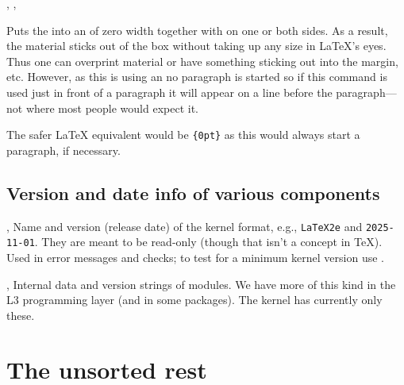 \documentclass{l3in2edoc}
\begin{document}
\begin{function}[]
  {
    \clap,
    \llap,
    \rlap
  }
  \begin{syntax}
     
  \end{syntax}
  Puts the  into an  of zero width together
  with  on one or both sides. As a result, the material sticks
  out of the box without taking up any size in \LaTeX{}'s eyes. Thus
  one can overprint material or have something sticking out into the
  margin, etc. However, as this is using an  no paragraph is
  started so if this command is used just in front of a paragraph it
  will appear on a line before the paragraph---not where most people
  would expect it.

  The safer \LaTeX{} equivalent would be
  \texttt{\{0pt\}} as this would
  always start a paragraph, if necessary.
\end{function}


\subsection{Version and date info of various components}


\begin{function}[]
  {
    \fmtname,
    \fmtversion
  }
  Name and version (release date) of the kernel format, e.g.,
  \texttt{LaTeX2e} and \texttt{2025-11-01}. They are meant to be
  read-only (though that isn't a concept in \TeX{}). Used in error
  messages and checks; to test for a minimum kernel version use
  .

\end{function}



\begin{function}[int]
  {
    \ltcmddate,
    \ltcmdversion
  }
  Internal data and version strings of modules. We have more of this
  kind in the L3 programming layer (and in some packages). The kernel
  has currently only these.
\end{function}







\section{The unsorted rest}
\end{document}
